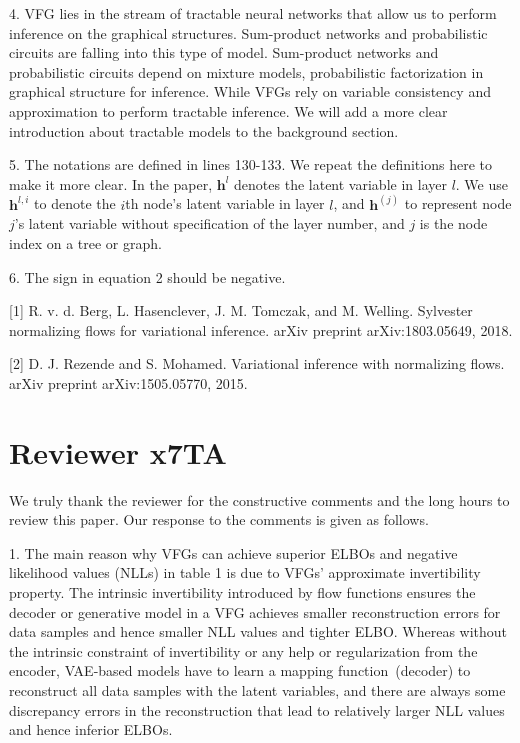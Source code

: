 \documentclass{article}
\begin{document}
4. VFG lies in the stream of tractable neural networks that allow us to perform inference on the graphical structures.  Sum-product networks and probabilistic circuits are falling into this type of model. Sum-product networks and probabilistic circuits depend on mixture models, probabilistic factorization in graphical structure for inference. While VFGs rely on variable consistency and approximation to perform tractable inference. We will add a more clear introduction about tractable models to the background section. 

5. The notations are defined in lines 130-133. We repeat the definitions here to make it more clear.   In the paper, $\mathbf{h}^l$ denotes the latent variable in layer $l$.   We use $\mathbf{h}^{l, i}$ to denote the $i$th node's latent variable  in layer $l$, and $\mathbf{h}^{(j)}$ to represent node $j$'s latent variable without specification of the layer number, and $j$ is the node index on a tree or graph. 


6. The sign in equation 2 should be negative. 


 [1] R. v. d. Berg, L. Hasenclever, J. M. Tomczak, and M. Welling. Sylvester normalizing flows for variational inference. arXiv preprint arXiv:1803.05649, 2018.
 
 [2] D. J. Rezende and S. Mohamed. Variational inference with normalizing flows. arXiv preprint arXiv:1505.05770, 2015.
 
 
\section{Reviewer x7TA}
We truly thank the reviewer for the constructive comments and the long hours to review this paper. Our response to the comments is given as follows. 

1.
The main reason why VFGs can achieve superior ELBOs and negative likelihood values (NLLs) in table 1 is due to VFGs' approximate invertibility property. The intrinsic invertibility introduced by flow functions ensures the decoder or generative model in a VFG  achieves smaller reconstruction errors for data samples and hence smaller NLL values and tighter ELBO. Whereas without the intrinsic constraint of invertibility or any help or regularization from the encoder, VAE-based models have to learn a mapping function~(decoder) to reconstruct all data samples with the latent variables, and there are always some discrepancy errors in the reconstruction that lead to relatively larger NLL values and hence inferior ELBOs.
\end{document}
